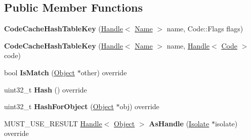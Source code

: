 \subsection*{Public Member Functions}
\begin{DoxyCompactItemize}
\item 
{\bfseries Code\+Cache\+Hash\+Table\+Key} (\hyperlink{classv8_1_1internal_1_1_handle}{Handle}$<$ \hyperlink{classv8_1_1internal_1_1_name}{Name} $>$ name, Code\+::\+Flags flags)\hypertarget{classv8_1_1internal_1_1_code_cache_hash_table_key_a9db3b32dd54b1b58aa819c7d97c80a9f}{}\label{classv8_1_1internal_1_1_code_cache_hash_table_key_a9db3b32dd54b1b58aa819c7d97c80a9f}

\item 
{\bfseries Code\+Cache\+Hash\+Table\+Key} (\hyperlink{classv8_1_1internal_1_1_handle}{Handle}$<$ \hyperlink{classv8_1_1internal_1_1_name}{Name} $>$ name, \hyperlink{classv8_1_1internal_1_1_handle}{Handle}$<$ \hyperlink{classv8_1_1internal_1_1_code}{Code} $>$ code)\hypertarget{classv8_1_1internal_1_1_code_cache_hash_table_key_ab77301648a515b6214cebdbed170aff3}{}\label{classv8_1_1internal_1_1_code_cache_hash_table_key_ab77301648a515b6214cebdbed170aff3}

\item 
bool {\bfseries Is\+Match} (\hyperlink{classv8_1_1internal_1_1_object}{Object} $\ast$other) override\hypertarget{classv8_1_1internal_1_1_code_cache_hash_table_key_a38a66d8982dd183aaf796e7d6b79bd12}{}\label{classv8_1_1internal_1_1_code_cache_hash_table_key_a38a66d8982dd183aaf796e7d6b79bd12}

\item 
uint32\+\_\+t {\bfseries Hash} () override\hypertarget{classv8_1_1internal_1_1_code_cache_hash_table_key_a1f9a98316741b8cfca8e65bc023d69b0}{}\label{classv8_1_1internal_1_1_code_cache_hash_table_key_a1f9a98316741b8cfca8e65bc023d69b0}

\item 
uint32\+\_\+t {\bfseries Hash\+For\+Object} (\hyperlink{classv8_1_1internal_1_1_object}{Object} $\ast$obj) override\hypertarget{classv8_1_1internal_1_1_code_cache_hash_table_key_a062b47384fb77f5a064337d1a608a769}{}\label{classv8_1_1internal_1_1_code_cache_hash_table_key_a062b47384fb77f5a064337d1a608a769}

\item 
M\+U\+S\+T\+\_\+\+U\+S\+E\+\_\+\+R\+E\+S\+U\+LT \hyperlink{classv8_1_1internal_1_1_handle}{Handle}$<$ \hyperlink{classv8_1_1internal_1_1_object}{Object} $>$ {\bfseries As\+Handle} (\hyperlink{classv8_1_1internal_1_1_isolate}{Isolate} $\ast$isolate) override\hypertarget{classv8_1_1internal_1_1_code_cache_hash_table_key_af41f04e060483fd8363542e4f7802aac}{}\label{classv8_1_1internal_1_1_code_cache_hash_table_key_af41f04e060483fd8363542e4f7802aac}

\end{DoxyCompactItemize}

